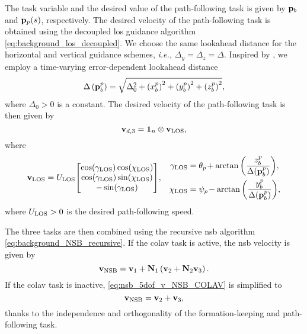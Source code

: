 The task variable and the desired value of the path-following task is given by $\mathbf{p}_b$ and $\mathbf{p}_p(s)$, respectively.
The desired velocity of the path-following task is obtained using the decoupled \gls{los} guidance algorithm \eqref{eq:background_los_decoupled}.
We choose the same lookahead distance for the horizontal and vertical guidance schemes, \emph{i.e.,} $\Delta_y = \Delta_z = \Delta$.
Inspired by \cite{belleter_2019_observer}, we employ a time-varying error-dependent lookahead distance
\begin{equation}
    \Delta\left(\mathbf{p}_b^p\right) = \sqrt{\Delta_0^2 + \left(x_b^p\right)^2 + \left(y_b^p\right)^2 + \left(z_b^p\right)^2}, \label{eq:nsb_5dof_delta}
\end{equation}
where $\Delta_0 > 0$ is a constant.
The desired velocity of the path-following task is then given by
\begin{equation}
    \mathbf{v}_{d, 3} = \mathbf{1}_n \otimes \mathbf{v}_{\rm LOS},
\end{equation}
where
\begin{align}
    \mathbf{v}_{\rm LOS} &= U_{\rm LOS} \!
    \begin{bmatrix}
        \cos(\gamma_{\rm LOS}) \cos(\chi_{\rm LOS}) \\
        \cos(\gamma_{\rm LOS}) \sin(\chi_{\rm LOS}) \\
        -\sin(\gamma_{\rm LOS})
    \end{bmatrix}\!, &
    \begin{split}
        \gamma_{\rm LOS} &= \theta_{p\!} + \arctan\left(\frac{z_b^p}{\Delta(\mathbf{p}_b^p)}\right)\!, \\
        \chi_{\rm LOS} &= \psi_{p\!} - \arctan\left(\frac{y_b^p}{\Delta(\mathbf{p}_b^p)}\right)\!, \\
    \end{split}
    \label{eq:nsb_5dof_v_LOS}
\end{align}
where $U_{\rm LOS} > 0$ is the desired path-following speed.

The three tasks are then combined using the recursive \gls{nsb} algorithm \eqref{eq:background_NSB_recursive}.
If the \gls{colav} task is active, the \gls{nsb} velocity is given by
\begin{equation}
    \mathbf{v}_{\rm NSB} = \mathbf{v}_1 + \mathbf{N}_1 \left(\mathbf{v}_2 + \mathbf{N}_2 \mathbf{v}_3\right).
    \label{eq:nsb_5dof_v_NSB_COLAV}
\end{equation}
If the \gls{colav} task is inactive, \eqref{eq:nsb_5dof_v_NSB_COLAV} is simplified to
\begin{equation}
    \mathbf{v}_{\rm NSB} = \mathbf{v}_2 + \mathbf{v}_3,
\end{equation}
thanks to the independence and orthogonality of the formation-keeping and path-following task.

